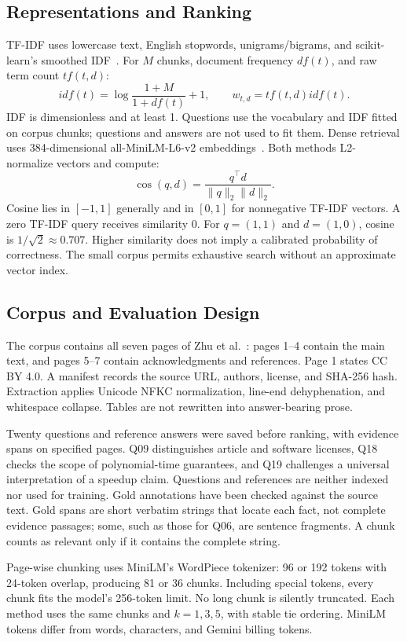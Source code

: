 \documentclass[12pt,a4paper]{article}
\begin{document}
\subsection*{Representations and Ranking}
TF-IDF uses lowercase text, English stopwords, unigrams/bigrams, and scikit-learn's smoothed IDF~\cite{sklearn}. For $M$ chunks, document frequency $df(t)$, and raw term count $tf(t,d)$:
\[idf(t)=\log\frac{1+M}{1+df(t)}+1,\qquad w_{t,d}=tf(t,d)idf(t).\]
IDF is dimensionless and at least 1. Questions use the vocabulary and IDF fitted on corpus chunks; questions and answers are not used to fit them. Dense retrieval uses 384-dimensional all-MiniLM-L6-v2 embeddings~\cite{minilm}. Both methods L2-normalize vectors and compute:
\[\operatorname{cos}(q,d)=\frac{q^\top d}{\|q\|_2\|d\|_2}.\]
Cosine lies in $[-1,1]$ generally and in $[0,1]$ for nonnegative TF-IDF vectors. A zero TF-IDF query receives similarity 0. For $q=(1,1)$ and $d=(1,0)$, cosine is $1/\sqrt2\approx0.707$. Higher similarity does not imply a calibrated probability of correctness. The small corpus permits exhaustive search without an approximate vector index.

\subsection*{Corpus and Evaluation Design}
The corpus contains all seven pages of Zhu et al.~\cite{abess}: pages 1--4 contain the main text, and pages 5--7 contain acknowledgments and references. Page 1 states CC BY 4.0. A manifest records the source URL, authors, license, and SHA-256 hash. Extraction applies Unicode NFKC normalization, line-end dehyphenation, and whitespace collapse. Tables are not rewritten into answer-bearing prose.

Twenty questions and reference answers were saved before ranking, with evidence spans on specified pages. Q09 distinguishes article and software licenses, Q18 checks the scope of polynomial-time guarantees, and Q19 challenges a universal interpretation of a speedup claim. Questions and references are neither indexed nor used for training. Gold annotations have been checked against the source text. Gold spans are short verbatim strings that locate each fact, not complete evidence passages; some, such as those for Q06, are sentence fragments. A chunk counts as relevant only if it contains the complete string.

Page-wise chunking uses MiniLM's WordPiece tokenizer: 96 or 192 tokens with 24-token overlap, producing 81 or 36 chunks. Including special tokens, every chunk fits the model's 256-token limit. No long chunk is silently truncated. Each method uses the same chunks and $k=1,3,5$, with stable tie ordering. MiniLM tokens differ from words, characters, and Gemini billing tokens.
\end{document}
